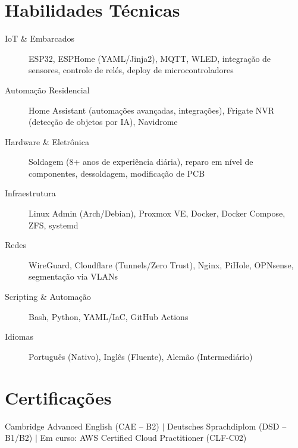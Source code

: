 \documentclass[10pt]{article}
\begin{document}
\section{Habilidades T\'{e}cnicas}
\begin{description}
	\item[IoT \& Embarcados] ESP32, ESPHome (YAML/Jinja2), MQTT, WLED, integra\c{c}\~{a}o de sensores, controle de rel\'{e}s, deploy de microcontroladores
	\item[Automa\c{c}\~{a}o Residencial] Home Assistant (automa\c{c}\~{o}es avan\c{c}adas, integra\c{c}\~{o}es), Frigate NVR (detec\c{c}\~{a}o de objetos por IA), Navidrome
	\item[Hardware \& Eletr\^{o}nica] Soldagem (8+ anos de experi\^{e}ncia di\'{a}ria), reparo em n\'{i}vel de componentes, dessoldagem, modifica\c{c}\~{a}o de PCB
	\item[Infraestrutura] Linux Admin (Arch/Debian), Proxmox VE, Docker, Docker Compose, ZFS, systemd
	\item[Redes] WireGuard, Cloudflare (Tunnels/Zero Trust), Nginx, PiHole, OPNsense, segmenta\c{c}\~{a}o via VLANs
	\item[Scripting \& Automa\c{c}\~{a}o] Bash, Python, YAML/IaC, GitHub Actions
	\item[Idiomas] Portugu\^{e}s (Nativo), Ingl\^{e}s (Fluente), Alem\~{a}o (Intermedi\'{a}rio)
\end{description}

\section{Certifica\c{c}\~{o}es}
Cambridge Advanced English (CAE -- B2) $|$ Deutsches Sprachdiplom (DSD -- B1/B2) $|$ Em curso: AWS Certified Cloud Practitioner (CLF-C02)
\end{document}
